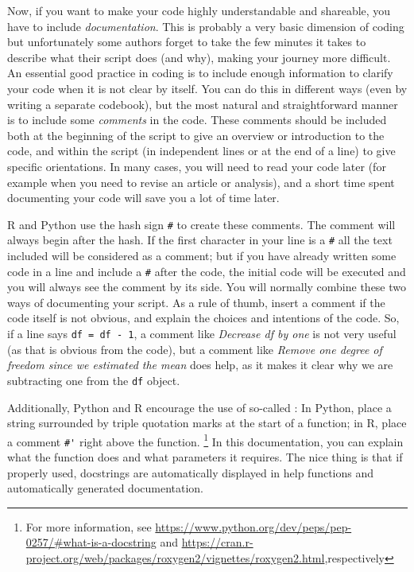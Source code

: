 Now, if you want to make your code highly understandable and shareable, you have to include \textit{documentation}.
This is probably a very basic dimension of coding but unfortunately some authors forget to take the few minutes it takes to describe what their script does (and why), making your journey more difficult.
An essential good practice in coding is to include enough information to clarify your code when it is not clear by itself.
You can do this in different ways (even by writing a separate codebook), but the most natural and straightforward manner is to include some  \textit{comments} in the code.
These comments should be included both at the beginning of the script to give an overview or introduction to the code,
and within the script (in independent lines or at the end of a line) to give specific orientations.
In many cases, you will need to read your code later (for example when you need to revise an article or analysis), and a short time spent documenting your code will save you a lot of time later.

R and Python use the hash sign \texttt{\#} to create these comments. The comment will always begin after the hash. If the first character in your line is  a \texttt{\#} all the text included will be considered as a comment; but if you have already written some code in a line and include a \texttt{\#} after the code, the initial code will be executed and you will always see the comment by its side. You will normally combine these two ways of documenting your script.
As a rule of thumb, insert a comment if the code itself is not obvious,
and explain the choices and intentions of the code.
So, if a line says \verb|df = df - 1|, a comment like \emph{Decrease df by one} is not very useful (as that is obvious from the code), but a comment like \emph{Remove one degree of freedom since we estimated the mean} does help, as it makes it clear why we are subtracting one from the \verb|df| object.

Additionally, Python and R encourage the use of so-called :
In Python, place a string surrounded by triple quotation marks at the start of a function; in R, place a comment \verb|#'| right above the function.
\footnote{For more information, see \url{https://www.python.org/dev/peps/pep-0257/\#what-is-a-docstring} and \url{https://cran.r-project.org/web/packages/roxygen2/vignettes/roxygen2.html},respectively}
In this documentation, you can explain what the function does and what parameters it requires.
The nice thing is that if properly used, docstrings are automatically displayed in help functions and automatically generated documentation.

